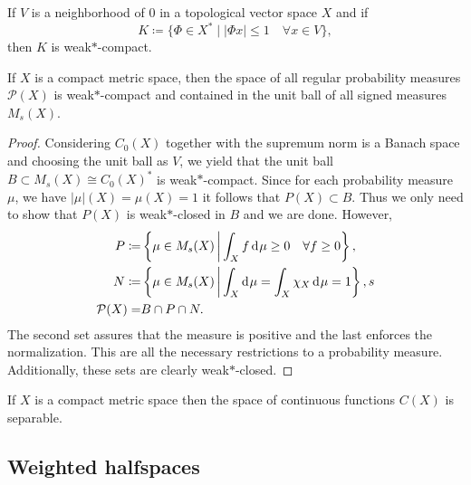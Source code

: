 \begin{thm}
  If \(V\) is a neighborhood of 0 in a topological vector space \(X\) and if
  \[
    K \coloneqq \{ \Phi \in X^\ast \mid |\Phi x| \leq 1 \quad \forall x \in V\},
  \]
  then \(K\) is weak\(\ast\)-compact.
\end{thm}

\begin{cor}
  \label{cor:banach-alaoglu}
  If \(X\) is a compact metric space, then the space of all regular probability measures \(\mathcal{P}(X)\) is weak\(\ast\)-compact and contained in the unit ball of all signed measures \(M_{s}(X)\).
\end{cor}

\begin{proof}
  Considering \(C_0(X)\) together with the supremum norm is a Banach space and choosing the unit ball as \(V\), we yield that the unit ball \(B \subset M_s(X) \cong C_0(X)^\ast\) is weak\(\ast\)-compact. Since for each probability measure \(\mu\), we have \(|\mu|(X) = \mu(X) = 1\) it follows that \(P(X) \subset B\). Thus we only need to show that \(P(X)\) is weak\(\ast\)-closed in \(B\) and we are done. However,
  \begin{align*}
    P \coloneqq & \left\{\mu \in M_s(X) \relmid \int_X f \d\mu \geq 0 \quad \forall f \geq 0\right\},\\
    N \coloneqq & \left\{\mu \in M_s(X) \relmid \int_X \d\mu = \int_X \chi_X \d\mu = 1\right\},s\\
    \mathcal{P}(X)  = & B \cap P \cap N.
  \end{align*}
  The second set assures that the measure is positive and the last enforces the normalization. This are all the necessary restrictions to a probability measure. Additionally, these sets are clearly weak\(\ast\)-closed.
\end{proof}

\begin{lemma}
  \label{lem:continuous-separable}
  If \(X\) is a compact metric space then the space of continuous functions \(C(X)\) is separable.
\end{lemma}

\subsection{Weighted halfspaces}
\label{sec:weight}

